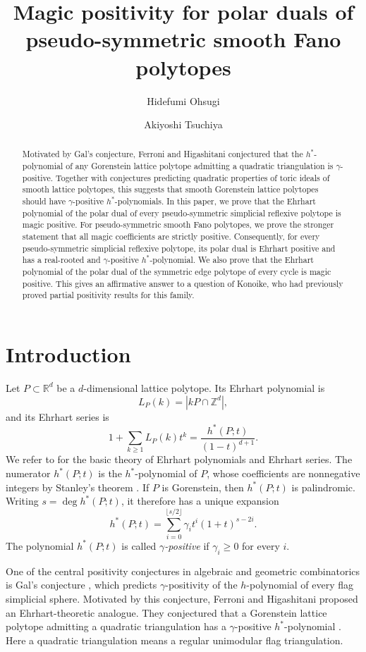 \documentclass[12pt]{amsart}
\title[Magic positivity for pseudo-symmetric Fano duals]
{Magic positivity for polar duals of pseudo-symmetric smooth Fano polytopes}
\author{Hidefumi Ohsugi}
\author{Akiyoshi Tsuchiya}
\theoremstyle{definition}
\newcommand{\ZZ}{\mathbb Z}
\newcommand{\RR}{\mathbb R}
\begin{document}
\begin{abstract}
Motivated by Gal's conjecture, Ferroni and Higashitani conjectured that 
the $h^*$-polynomial of any Gorenstein lattice polytope admitting a quadratic triangulation is
$\gamma$-positive.  
Together with conjectures predicting
quadratic properties of toric ideals of smooth lattice polytopes, this
suggests that smooth Gorenstein lattice polytopes should have
$\gamma$-positive $h^*$-polynomials.
In this paper, we prove that the Ehrhart polynomial of the polar dual
of every pseudo-symmetric simplicial reflexive polytope is magic positive.
For pseudo-symmetric smooth Fano polytopes, we prove the stronger
statement that all magic coefficients are strictly positive.
Consequently, for every pseudo-symmetric simplicial reflexive polytope,
its polar dual is Ehrhart positive and has a real-rooted and
$\gamma$-positive $h^*$-polynomial.
We also prove that the Ehrhart polynomial of the polar dual of the
symmetric edge polytope of every cycle is magic positive.  This gives an
affirmative answer to a question of Konoike, who had previously proved
partial positivity results for this family.
\end{abstract}

\maketitle

\section{Introduction}

Let $P\subset\RR^d$ be a $d$-dimensional lattice polytope.  Its Ehrhart
polynomial is
\[
L_P(k)=|kP\cap\ZZ^d|,
\]
and its Ehrhart series is
\[
1+\sum_{k\ge1}L_P(k)t^k
=
\frac{h^*(P;t)}{(1-t)^{d+1}}.
\]
We refer to \cite{BeckRobins} for the basic theory of Ehrhart polynomials
and Ehrhart series.  The numerator $h^*(P;t)$ is the $h^*$-polynomial of
$P$, whose coefficients are nonnegative integers by Stanley's theorem
\cite{StanleyDecompositions}.  If $P$ is Gorenstein, then $h^*(P;t)$ is
palindromic.  Writing $s=\deg h^*(P;t)$, it therefore has a unique
expansion
\[
h^*(P;t)
=
\sum_{i=0}^{\lfloor s/2\rfloor}
\gamma_i t^i(1+t)^{s-2i}.
\]
The polynomial $h^*(P;t)$ is called \emph{$\gamma$-positive} if
$\gamma_i\ge0$ for every $i$.

One of the central positivity conjectures in algebraic and geometric
combinatorics is Gal's conjecture \cite{Gal}, which predicts
$\gamma$-positivity of the $h$-polynomial of every flag simplicial sphere.
Motivated by this conjecture, Ferroni and Higashitani proposed an
Ehrhart-theoretic analogue.  They conjectured that a Gorenstein lattice
polytope admitting a quadratic triangulation has a $\gamma$-positive
$h^*$-polynomial
\cite[Conjecture~3.28]{FerroniHigashitani}.  Here a quadratic triangulation
means a regular unimodular flag triangulation.
\end{document}
